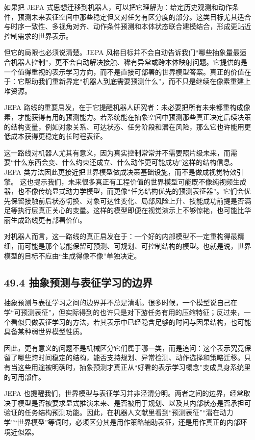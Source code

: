 如果把 JEPA 式思想迁移到机器人，可以把它理解为：给定历史观测和动作条件，预测未来表征空间中那些稳定但又对任务有区分度的部分。这类目标尤其适合与时序一致性、多视角对齐、动作条件预测和本体状态联合建模结合，形成更贴近控制需求的世界表示。

但它的局限也必须说清楚。JEPA 风格目标并不会自动告诉我们“哪些抽象量最适合机器人控制”，更不会自动解决接触、稀有异常或跨本体映射问题。它提供的是一个值得重视的表示学习方向，而不是直接可部署的世界模型答案。真正的价值在于：它帮助我们重新界定“机器人到底需要预测什么”，而不只是继续在像素重建上堆资源。

JEPA 路线的重要启发，在于它提醒机器人研究者：未必要把所有未来都重构成像素，才能获得有用的预测能力。若系统能在抽象空间中预测那些真正决定后续决策的结构变量，例如对象关系、可达状态、任务阶段和潜在风险，那么它也许能用更低成本获得更稳定的长时程表征。

这一路线对机器人尤其有意义，因为真实控制常常并不需要照片级未来，而需要“什么东西会变、什么约束还成立、什么动作更可能成功”这样的结构信息。JEPA 类方法因此更接近把世界模型做成决策基础设施，而不是做成视觉特效引擎。 这也提示我们，未来很多真正有工程价值的世界模型可能既不像纯视频生成器，也不像传统显式动力学模型，而更像“任务结构优先的预测表征器”。它们会优先保留接触前后状态切换、对象可达性变化、局部风险上升、技能成功前提是否满足等执行层真正关心的变量。这样的模型即便在视觉演示上不够惊艳，也可能比华丽生成路线更有部署价值。

对机器人而言，这一路线的真正启发在于：一个好的内部模型不一定重构得最精细，而可能是那个最能保留可预测、可规划、可控制结构的模型。也就是说，世界模型的目标不应由“生成得像不像”单独决定。

\subsection*{49.4 抽象预测与表征学习的边界}


抽象预测与表征学习之间的边界并不总是清晰。很多时候，一个模型说自己在学“可预测表征”，但实际得到的也许只是对下游任务有用的压缩特征；反过来，一个看似只做表征学习的方法，若其表示中已经隐含足够的时间与因果结构，也可能具备某种弱世界模型性质。

因此，更有意义的问题不是机械区分它们属于哪一类，而是追问：这个表示究竟保留了哪些跨时间稳定的结构，能否支持规划、异常检测、动作选择和策略迁移。只有当这些用途被明确时，抽象预测才真正从“好看的表示学习概念”变成具身系统里的可用部件。

JEPA 也提醒我们，世界模型与表征学习并非泾渭分明。两者之间的边界，经常取决于模型是否被要求显式推演未来、是否被用于规划、以及其内部状态是否承担可验证的任务结构预测功能。因此，在机器人文献里看到“预测表征”“潜在动力学”“世界模型”等词时，必须区分其是用作策略辅助表征，还是用作真正的内部环境近似器。

